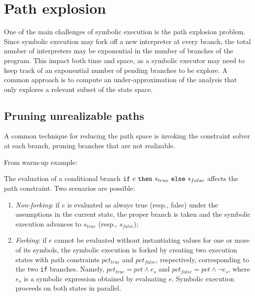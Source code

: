 
\section{Path explosion}

One of the main challenges of symbolic execution is the path explosion problem. Since symbolic execution may fork off a new interpreter at every branch, the total number of interpreters may be exponential in the number of branches of the program. This impact both time and space, as a symbolic executor may need to keep track of an exponential number of pending branches to be explore. A common approach is to compute an under-approximation of the analysis that only explores a relevant subset of the state space.

\subsection{Pruning unrealizable paths}

A common technique for reducing the path space is invoking the constraint solver at each branch, pruning branches that are not realizable. 

From warm-up example:

The evaluation of a conditional branch ${\tt if}~e~{\tt then}~s_{true}~{\tt else}~s_{false}$ affects the path constraint. Two scenarios are possible:
    \begin{enumerate}
      \item {\em Non-forking}: if $e$ is evaluated as always true (resp., false) under the assumptions in the current state, the proper branch is taken and the symbolic execution advances to $s_{true}$ (resp., $s_{false}$);
      \item {\em Forking}: if $e$ cannot be evaluated without instantiating values for one or more of its symbols, the symbolic execution is forked by creating two execution states with path constraints $pct_{true}$ and $pct_{false}$, respectively, corresponding to the two {\tt if} branches. Namely, $pct_{true}=pct \wedge e_s$ and $pct_{false}=pct \wedge \neg e_s$, where $e_s$ is a symbolic expression obtained by evaluating $e$. 
    Symbolic execution proceeds on both states in parallel.
    \end{enumerate}



